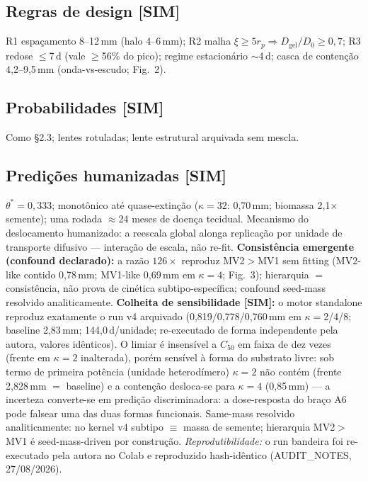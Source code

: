 \documentclass[10pt,twocolumn]{article}
\begin{document}
\subsection{Regras de design [SIM]}
R1 espaçamento 8--12\,mm (halo 4--6\,mm); R2 malha $\xi\ge5r_p\Rightarrow D_{\text{gel}}/D_0\ge0,7$; R3 redose $\le$7\,d (vale $\ge$56\% do pico); regime estacionário $\sim$4\,d; casca de contenção 4,2--9,5\,mm (onda-vs-escudo; Fig.~2).

\subsection{Probabilidades [SIM]}
Como \S2.3; lentes rotuladas; lente estrutural arquivada sem mescla.

\subsection{Predições humanizadas [SIM]}
$\theta^{*}{=}0,333$; monotônico até quase-extinção ($\kappa{=}32$: 0,70\,mm; biomassa 2,1$\times$ semente); uma rodada $\approx$24 meses de doença tecidual. Mecanismo do deslocamento humanizado: a reescala global alonga replicação por unidade de transporte difusivo --- interação de escala, não re-fit. \textbf{Consistência emergente (confound declarado):} a razão $126\times$ reproduz MV2$>$MV1 sem fitting (MV2-like contido 0,78\,mm; MV1-like 0,69\,mm em $\kappa{=}4$; Fig.~3); hierarquia $=$ consistência, não prova de cinética subtipo-específica; confound seed-mass resolvido analiticamente. \textbf{Colheita de sensibilidade [SIM]:} o motor standalone reproduz exatamente o run v4 arquivado (0,819/0,778/0,760\,mm em $\kappa{=}$2/4/8; baseline 2,83\,mm; 144,0\,d/unidade; re-executado de forma independente pela autora, valores idênticos). O limiar é insensível a $C_{50}$ em faixa de dez vezes (frente em $\kappa{=}2$ inalterada), porém sensível à forma do substrato livre: sob termo de primeira potência (unidade heterodímero) $\kappa{=}2$ não contém (frente 2,828\,mm $=$ baseline) e a contenção desloca-se para $\kappa{=}4$ (0,85\,mm) --- a incerteza converte-se em predição discriminadora: a dose-resposta do braço A6 pode falsear uma das duas formas funcionais. Same-mass resolvido analiticamente: no kernel v4 subtipo $\equiv$ massa de semente; hierarquia MV2$>$MV1 é seed-mass-driven por construção.  \emph{Reprodutibilidade:} o run bandeira foi re-executado pela autora no Colab e reproduzido hash-idêntico (AUDIT\_NOTES, 27/08/2026).
\end{document}
